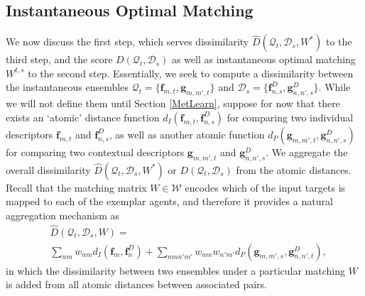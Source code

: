 \subsection{Instantaneous Optimal Matching}
\label{agg}

We now discuss the first step, which serves dissimilarity $\hat{D}(\mathcal{Q}_{t}, \mathcal{D}_{s}, W^{*})$ to the third step, and the score $D(\mathcal{Q}_{t}, \mathcal{D}_{s})$ as well as instantaneous optimal matching $W^{t,s}$ to the second step. Essentially, we seek to compute a dissimilarity between the instantaneous ensembles $\mathcal{Q}_{t}=\{\mathbf{f}_{m,t},\mathbf{g}_{m,m',t}\}$ and $\mathcal{D}_{s}=\{\mathbf{f}^{D}_{n,s},\mathbf{g}^{D}_{n,n',s}\}$. While we will not define them until Section \ref{MetLearn}, suppose for now that there exists an `atomic' distance function $d_{I}(\mathbf{f}_{m,t}, \mathbf{f}^{D}_{n,s}) $ for comparing two individual descriptors $\mathbf{f}_{m,t}$ and $\mathbf{f}^{D}_{n,s}$, as well as another atomic function $d_{P}(\mathbf{g}_{m,m',t}, \mathbf{g}^{D}_{n,n',s}) $ for comparing two contextual descriptors $\mathbf{g}_{m,m',t}$ and $\mathbf{g}^{D}_{n,n',s}$. We aggregate the overall dissimilarity $\hat{D}(\mathcal{Q}_{t}, \mathcal{D}_{s}, W^{*})$ or $D(\mathcal{Q}_{t}, \mathcal{D}_{s})$ from the atomic distances. Recall that the matching matrix $W\in\mathcal{W}$ encodes which of the input targets is mapped to each of the exemplar agents, and therefore it provides a natural aggregation mechanism as 
\begin{equation}
\begin{split}
&\hat{D}(\mathcal{Q}_{t}, \mathcal{D}_{s}, W)=\\
&\sum_{nm}w_{nm}d_{I}(\mathbf{f}_{m}, \mathbf{f}^{D}_{n})+\sum_{nmn'm'}w_{nm}w_{n'm'}d_{P}(\mathbf{g}_{m,m',s}, \mathbf{g}^{D}_{n,n',t}),
\end{split}
\end{equation}
in which the dissimilarity between two ensembles under a particular matching $W$ is added from all atomic distances between associated pairs.

